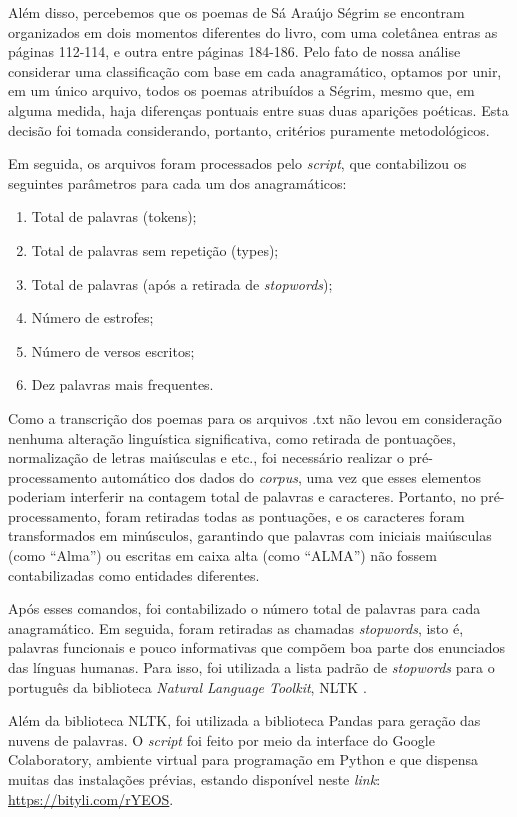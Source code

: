 \documentclass[portuguese]{textolivre}
\begin{document}
Além disso, percebemos que os poemas de Sá Araújo Ségrim se encontram organizados em dois momentos diferentes do livro, com uma coletânea entras as páginas 112-114, e outra entre páginas 184-186. Pelo fato de nossa análise considerar uma classificação com base em cada anagramático, optamos por unir, em um único arquivo, todos os poemas atribuídos a Ségrim, mesmo que, em alguma medida, haja diferenças pontuais entre suas duas aparições poéticas. Esta decisão foi tomada considerando, portanto, critérios puramente metodológicos.

Em seguida, os arquivos foram processados pelo \textit{script}, que contabilizou os seguintes parâmetros para cada um dos anagramáticos:

\begin{enumerate}[label=\alph*.]
    \item Total de palavras (tokens);
    \item Total de palavras sem repetição (types);
    \item Total de palavras (após a retirada de \textit{stopwords});
    \item Número de estrofes;
    \item Número de versos escritos;
    \item Dez palavras mais frequentes.
\end{enumerate}
 
Como a transcrição dos poemas para os arquivos .txt não levou em consideração nenhuma alteração linguística significativa, como retirada de pontuações, normalização de letras maiúsculas e etc., foi necessário realizar o pré-processamento automático dos dados do \textit{corpus}, uma vez que esses elementos poderiam interferir na contagem total de palavras e caracteres. Portanto, no pré-processamento, foram retiradas todas as pontuações, e os caracteres foram transformados em minúsculos, garantindo que palavras com iniciais maiúsculas (como “Alma”) ou escritas em caixa alta (como “ALMA”) não fossem contabilizadas como entidades diferentes. 

Após esses comandos, foi contabilizado o número total de palavras para cada anagramático. Em seguida, foram retiradas as chamadas \textit{stopwords}, isto é, palavras funcionais e pouco informativas que compõem boa parte dos enunciados das línguas humanas. Para isso, foi utilizada a lista padrão de \textit{stopwords} para o português da biblioteca \textit{Natural Language Toolkit}, NLTK \cite{bird_natural_2009}. 

Além da biblioteca NLTK, foi utilizada a biblioteca Pandas \cite{mckinney_data_2010} para geração das nuvens de palavras. O \textit{script} foi feito por meio da interface do Google Colaboratory, ambiente virtual para programação em Python e que dispensa muitas das instalações prévias, estando disponível neste \textit{link}: \url{https://bityli.com/rYEOS}.
\end{document}
